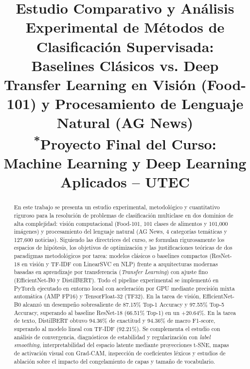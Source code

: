 \documentclass[conference]{IEEEtran}
\begin{document}
\title{Estudio Comparativo y Análisis Experimental de Métodos de Clasificación Supervisada: Baselines Clásicos vs. Deep Transfer Learning en Visión (Food-101) y Procesamiento de Lenguaje Natural (AG News)\\
{\footnotesize \textsuperscript{*}Proyecto Final del Curso: Machine Learning y Deep Learning Aplicados -- UTEC}
}

\author{
}

\maketitle

\begin{abstract}
En este trabajo se presenta un estudio experimental, metodológico y cuantitativo riguroso para la resolución de problemas de clasificación multiclase en dos dominios de alta complejidad: visión computacional (Food-101, 101 clases de alimentos y 101,000 imágenes) y procesamiento del lenguaje natural (AG News, 4 categorías temáticas y 127,600 noticias). Siguiendo las directrices del curso, se formulan rigurosamente los espacios de hipótesis, los objetivos de optimización y las justificaciones teóricas de dos paradigmas metodológicos por tarea: modelos clásicos o baselines compactos (ResNet-18 en visión y TF-IDF con LinearSVC en NLP) frente a arquitecturas modernas basadas en aprendizaje por transferencia (\textit{Transfer Learning}) con ajuste fino (EfficientNet-B0 y DistilBERT). Todo el pipeline experimental se implementó en PyTorch ejecutado en entorno local con aceleración por GPU mediante precisión mixta automática (AMP FP16) y TensorFloat-32 (TF32). En la tarea de visión, EfficientNet-B0 alcanzó un desempeño sobresaliente de 87.15\% Top-1 Accuracy y 97.55\% Top-5 Accuracy, superando al baseline ResNet-18 (66.51\% Top-1) en un +20.64\%. En la tarea de texto, DistilBERT obtuvo 94.36\% de exactitud y 94.36\% de macro F1-score, superando al modelo lineal con TF-IDF (92.21\%). Se complementa el estudio con análisis de convergencia, diagnósticos de estabilidad y regularización con \textit{label smoothing}, interpretabilidad del espacio latente mediante proyecciones t-SNE, mapas de activación visual con Grad-CAM, inspección de coeficientes léxicos y estudios de ablación sobre el impacto del congelamiento de capas y tamaño de vocabulario.
\end{abstract}
\end{document}
